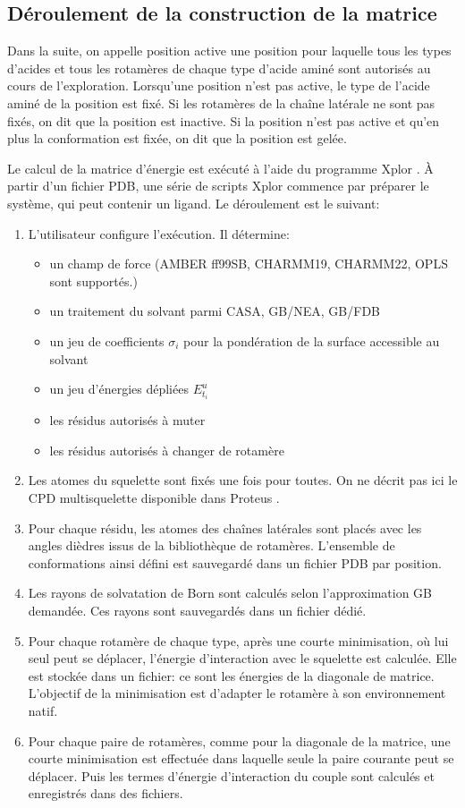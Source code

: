 \subsection{Déroulement de la construction de la matrice}
\label{sub:matrix}
Dans la suite, on appelle position active une position pour laquelle tous les types d'acides et tous les rotamères de chaque type d'acide aminé sont autorisés au cours de l'exploration. Lorsqu'une position n'est pas active, le type de l'acide aminé de la position est fixé. Si les rotamères de la chaîne latérale ne sont pas fixés, on dit que la position est inactive. Si la position n'est pas active et qu'en plus la conformation est fixée, on dit que la position est gelée.

Le calcul de la matrice d'énergie est exécuté à l'aide du programme Xplor \cite{Xplor}. À partir d'un fichier PDB, une série de scripts Xplor commence par préparer le système, qui peut contenir un ligand. Le déroulement est le suivant:

\begin{enumerate}[leftmargin=*]
\item L'utilisateur configure l'exécution. Il détermine:
\begin{itemize}
\item un champ de force (AMBER ff99SB, CHARMM19, CHARMM22, OPLS sont supportés.)
\item un traitement du solvant parmi CASA, GB/NEA, GB/FDB
\item un jeu de coefficients $\sigma_i$ pour la pondération de la surface accessible au solvant
\item un jeu d'énergies dépliées $E^u_{t_i}$  
\item les résidus autorisés à muter
\item les résidus autorisés à changer de rotamère 
\end{itemize}
\item Les atomes du squelette sont fixés une fois pour toutes. On ne décrit pas ici le CPD multisquelette disponible dans Proteus \cite{Druart16}.
\item Pour chaque résidu, les atomes des chaînes latérales sont placés avec les angles dièdres issus de la bibliothèque de rotamères. L'ensemble de conformations ainsi défini est sauvegardé dans un fichier PDB par position.
\item Les rayons de solvatation de Born sont calculés selon l'approximation GB demandée. Ces rayons sont sauvegardés dans un fichier dédié.
\item Pour chaque rotamère de chaque type, après une courte minimisation, où lui seul peut se déplacer, l'énergie d'interaction avec le squelette est calculée. Elle est stockée dans un fichier: ce sont les énergies de la diagonale de matrice. L'objectif de la minimisation est d'adapter le rotamère à son environnement natif.
\item Pour chaque paire de rotamères, comme pour la diagonale de la matrice, une courte minimisation est effectuée dans laquelle seule la paire courante peut se déplacer. Puis les termes d'énergie d'interaction du couple sont calculés et enregistrés dans des fichiers.  
\end{enumerate}

